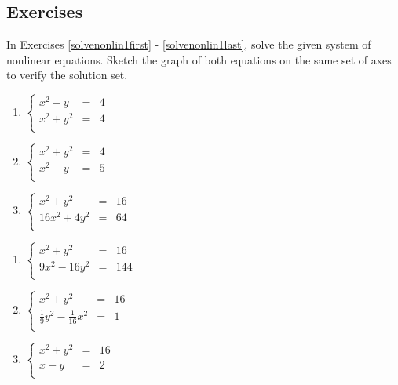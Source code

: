 \newpage

\subsection{Exercises}

In Exercises \ref{solvenonlin1first} - \ref{solvenonlin1last}, solve the given system of nonlinear equations.  Sketch the graph of both equations on the same set of axes to verify the solution set. 

\begin{multicols}{3}
\begin{enumerate}

\item $\left\{\begin{array}{rcr}  x^2 - y & = & 4 \\ x^{2} + y^{2} & = & 4 \\ \end{array} \right.$ \label{solvenonlin1first}
\item $\left\{\begin{array}{rcr}  x^{2} + y^{2} & = & 4 \\ x^2 - y & = & 5 \\ \end{array} \right.$
\item $\left\{\begin{array}{rcr}  x^2+y^2 & = & 16 \\ 16x^{2} + 4y^{2} & = & 64 \\ \end{array} \right.$

\setcounter{HW}{\value{enumi}}
\end{enumerate}
\end{multicols}

\begin{multicols}{3}
\begin{enumerate}
\setcounter{enumi}{\value{HW}}

\item $\left\{\begin{array}{rcr}  x^2+y^2 & = & 16 \\ 9x^{2} - 16y^{2} & = & 144 \\ \end{array} \right.$
\item $\left\{\begin{array}{rcr}  x^2+y^2 & = & 16 \\ \frac{1}{9} y^2 - \frac{1}{16} x^2& = & 1 \\ \end{array} \right.$
\item $\left\{\begin{array}{rcr}  x^{2} + y^{2} & = & 16 \\ x-y & = & 2 \\ \end{array} \right.$ \label{solvenonlin1last}

\setcounter{HW}{\value{enumi}}
\end{enumerate}
\end{multicols}

